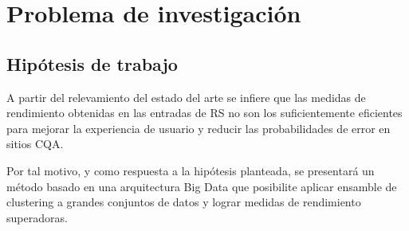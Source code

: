 \newpage \section{Problema de investigación} \label{ch:problema_investigacion}
\subsection{Hipótesis de trabajo}
\noindent A partir del relevamiento del estado del arte se infiere que las medidas de rendimiento obtenidas en las entradas de RS no son los suficientemente eficientes para mejorar la experiencia de usuario y reducir las probabilidades de error en sitios CQA.

\bigskip Por tal motivo, y como respuesta a la hipótesis planteada, se presentará un método basado en una arquitectura Big Data que posibilite aplicar ensamble de clustering a grandes conjuntos de datos y lograr medidas de rendimiento superadoras.

